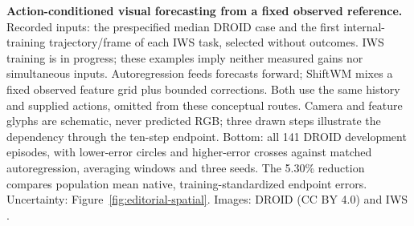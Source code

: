 \textbf{Action-conditioned visual forecasting from a fixed observed reference.} Recorded inputs: the prespecified median DROID case and the first internal-training trajectory/frame of each IWS task, selected without outcomes. IWS training is in progress; these examples imply neither measured gains nor simultaneous inputs. Autoregression feeds forecasts forward; ShiftWM mixes a fixed observed feature grid plus bounded corrections. Both use the same history and supplied actions, omitted from these conceptual routes. Camera and feature glyphs are schematic, never predicted RGB; three drawn steps illustrate the dependency through the ten-step endpoint. Bottom: all 141 DROID development episodes, with lower-error circles and higher-error crosses against matched autoregression, averaging windows and three seeds. The 5.30\% reduction compares population mean native, training-standardized endpoint errors. Uncertainty: Figure~\ref{fig:editorial-spatial}. Images: DROID (CC BY 4.0) and IWS \citep{zhang2026rlawm}.
